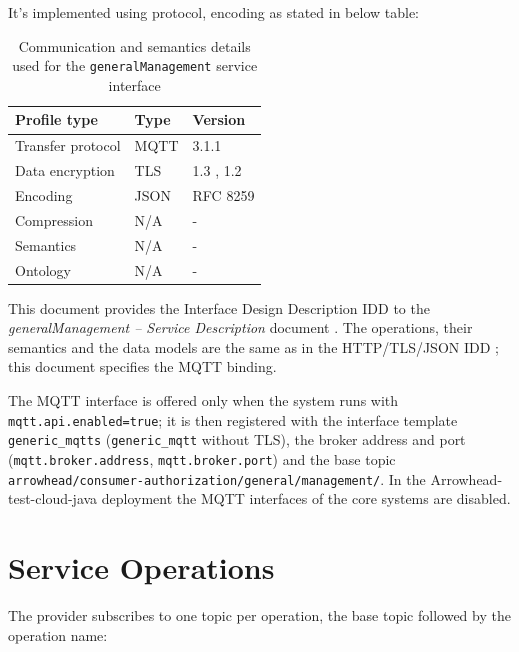 \documentclass[a4paper]{arrowhead}
\begin{document}
It's implemented using protocol, encoding as stated in below table:
\begin{table}[ht!]
  \centering
  \begin{tabular}{|l|l|l|}
    \hline
    \rowcolor{gray!33} Profile type & Type & Version \\ \hline
    Transfer protocol & MQTT & 3.1.1 \cite{mqtt311} \\ \hline
    Data encryption & TLS & 1.3 \cite{rfc8446}, 1.2 \cite{rfc5246} \\ \hline
    Encoding & JSON & RFC 8259 \cite{rfc8259} \\ \hline
    Compression & N/A & - \\ \hline
    Semantics & N/A & - \\ \hline
    Ontology & N/A & - \\ \hline
  \end{tabular}
  \caption{Communication and semantics details used for the \texttt{generalManagement} service interface}
  \label{tab:comunication_semantics_profile}
\end{table}

This document provides the Interface Design Description IDD to the \textit{generalManagement -- Service Description} document \cite{ca-generalManagement-sd}.
The operations, their semantics and the data models are the same as in the HTTP/TLS/JSON IDD \cite{ca-generalManagement-http-idd}; this document specifies the MQTT binding.

The MQTT interface is offered only when the system runs with \texttt{mqtt.api.enabled=true}; it is then registered with the interface template \texttt{generic\_\allowbreak{}mqtts} (\texttt{generic\_\allowbreak{}mqtt} without TLS), the broker address and port (\texttt{mqtt.\allowbreak{}broker.\allowbreak{}address}, \texttt{mqtt.\allowbreak{}broker.\allowbreak{}port}) and the base topic \texttt{arrowhead/\allowbreak{}consumer-\allowbreak{}authorization/\allowbreak{}general/\allowbreak{}management/\allowbreak{}}. In the Arrowhead-test-cloud-java deployment the MQTT interfaces of the core systems are disabled.

\newpage

\section{Service Operations}
\label{sec:operations}

The provider subscribes to one topic per operation, the base topic followed by the operation name:
\end{document}
